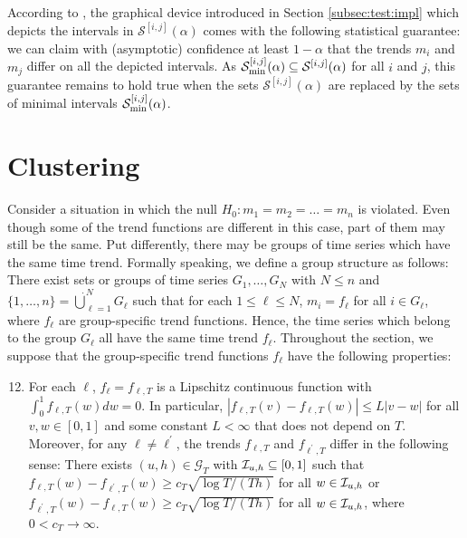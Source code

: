 \documentclass[12pt]{article}
\makeatletter
\renewcommand{\eqref}[1]{\tagform@{\ref{#1}}}
\makeatother
\begin{document}
\begin{remark}
According to \eqref{eq:CS-v2}, the graphical device introduced in Section \ref{subsec:test:impl} which depicts the intervals in $\mathcal{S}^{[i, j]}(\alpha)$ comes with the following statistical guarantee: we can claim with (asymptotic) confidence at least $1-\alpha$ that the trends $m_i$ and $m_j$ differ on all the depicted intervals. As $\mathcal{S}^{[i, j]}_{\textnormal{min}}(\alpha) \subseteq \mathcal{S}^{[i, j]}(\alpha)$ for all $i$ and $j$, this guarantee remains to hold true when the sets $\mathcal{S}^{[i, j]}(\alpha)$ are replaced by the sets of minimal intervals $\mathcal{S}_{\textnormal{min}}^{[i, j]}(\alpha)$.
\end{remark}



\section{Clustering}\label{sec:clustering}


Consider a situation in which the null $H_0: m_1 = m_2 = \ldots = m_n$ is violated. Even though some of the trend functions are different in this case, part of them may still be the same. Put differently, there may be groups of time series which have the same time trend. Formally speaking, we define a group structure as follows: There exist sets or groups of time series $G_1,\ldots, G_N$ with $N \le n$ and $\{1,\ldots, n\} = \mathbin{\dot{\bigcup}}_{\ell=1}^{N} G_\ell$ such that for each $1 \le \ell \le N$,
$m_i = f_\ell$ for all $i \in G_\ell$, 
where $f_\ell$ are group-specific trend functions. Hence, the time series which belong to the group $G_\ell$ all have the same time trend $f_\ell$. Throughout the section, we suppose that the group-specific trend functions $f_\ell$ have the following properties: 
\begin{enumerate}[label=(C\arabic*),leftmargin=1.2cm,topsep=3pt]
\setcounter{enumi}{11}
\item \label{C-clustering} For each $\ell$, $f_\ell = f_{\ell,T}$ is a Lipschitz continuous function with $\int_0^1 f_{\ell,T}(w) dw = 0$. In particular, $|f_{\ell,T}(v) - f_{\ell,T}(w)| \le L |v-w|$ for all $v, w \in [0,1]$ and some constant $L < \infty$ that does not depend on $T$. Moreover, for any $\ell \ne \ell^\prime$, the trends $f_{\ell,T}$ and $f_{\ell^\prime,T}$ differ in the following sense: There exists $(u, h) \in \mathcal{G}_T$ with $\mathcal{I}_{u, h} \subseteq [0,1]$ such that $f_{\ell,T}(w) - f_{\ell^\prime,T}(w) \ge c_T \sqrt{\log T/(Th)}$ for all $w \in \mathcal{I}_{u, h}$ or $f_{\ell^\prime,T}(w) - f_{\ell,T}(w) \ge c_T \sqrt{\log T/(Th)}$ for all $w \in \mathcal{I}_{u, h}$, where $0 < c_T \rightarrow \infty$.
\end{enumerate}
\end{document}
